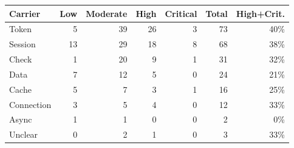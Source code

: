 \begin{tabular}{lrrrrrr}
\toprule
Carrier & Low & Moderate & High & Critical & Total & High+Crit. \\
\midrule
Token & 5 & 39 & 26 & 3 & 73 & 40\% \\
Session & 13 & 29 & 18 & 8 & 68 & 38\% \\
Check & 1 & 20 & 9 & 1 & 31 & 32\% \\
Data & 7 & 12 & 5 & 0 & 24 & 21\% \\
Cache & 5 & 7 & 3 & 1 & 16 & 25\% \\
Connection & 3 & 5 & 4 & 0 & 12 & 33\% \\
Async & 1 & 1 & 0 & 0 & 2 & 0\% \\
Unclear & 0 & 2 & 1 & 0 & 3 & 33\% \\
\bottomrule
\end{tabular}
